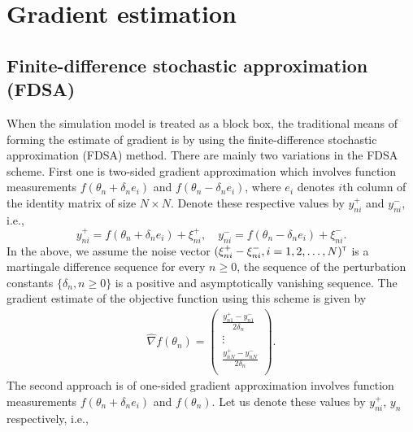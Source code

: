 %
\section{Gradient estimation}\label{sec:gradest}
\subsection{Finite-difference stochastic approximation (FDSA)}
When the simulation model is treated as a block box, the traditional means of forming the estimate of gradient is by using the finite-difference stochastic approximation (FDSA) method. There are mainly two variations in the FDSA scheme. First one is  two-sided gradient approximation which involves function measurements $f(\theta_n + \delta_n e_i)$ and $f(\theta_n - \delta_n e_i)$, where $e_i$ denotes $i$th column of the identity matrix of size $N \times N$. Denote these respective values by $y_{ni}^+$ and $y_{ni}^-$, i.e., 
$$
y_{ni}^+ = f(\theta_n+\delta_n e_i) + \xi_{ni}^+,\quad y_{ni}^- = f(\theta_n-\delta_n e_i) + \xi_{ni}^-.
$$
In the above, we assume the noise vector $(\xi_{ni}^+ - \xi_{ni}^-, i=1,2,\ldots,N)^\mathsf{\scriptscriptstyle T}$ is a martingale difference sequence for every $n \ge 0$, the sequence of the perturbation constants $\{\delta_n, n\ge 0\}$ is a positive and asymptotically vanishing sequence. The gradient estimate of the objective function using this scheme is given by
\begin{align}\label{eq:twofdsa}
 \widehat{\nabla} f(\theta_{n}) = \left(
\begin{array}{c}
\frac{y_{n1}^+ - y_{n1}^-}{2\delta_n}\\
\vdots\\
\frac{y_{nN}^+ - y_{nN}^-}{2\delta_n}\\
\end{array}
\right).
\end{align}
The second approach is of one-sided gradient approximation  involves function measurements $f(\theta_n+\delta_n e_i)$ and $f(\theta_n)$. Let us denote these values by  $y_{ni}^+$, $y_{n}$  respectively, i.e., 
